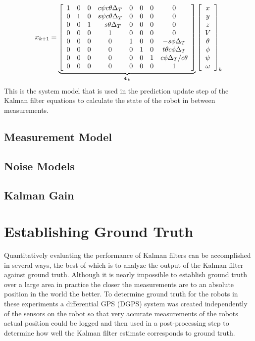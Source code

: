 \begin{align}
\label{eq:kfSystemModelWithAssumptions}
x_{k+1} = 
\underbrace{\left[\begin{array}{c c c c c c c c}
1 & 0 & 0 & c\psi c\theta \Delta_T & 0 & 0 & 0 & 0 \\
0 & 1 & 0 & s\psi c\theta \Delta_T & 0 & 0 & 0 & 0\\
0 & 0 & 1 & -s\theta \Delta_T & 0 & 0 & 0 & 0\\
0 & 0 & 0 & 1 & 0 & 0 & 0 & 0 \\
0 & 0 & 0 & 0 & 1 & 0 & 0 & -s\phi \Delta_T \\
0 & 0 & 0 & 0 & 0 & 1 & 0 & t\theta c\phi \Delta_T \\
0 & 0 & 0 & 0 & 0 & 0 & 1 & c\phi \Delta_T/c\theta \\
0 & 0 & 0 & 0 & 0 & 0 & 0 & 1
\end{array}\right]}_{\Phi_k}
\left[\begin{array}{c}
x \\ y \\ z \\ V \\ \theta \\ \phi \\ \psi \\ \omega
\end{array}\right]_k
\end{align}
This is the system model that is used in the prediction update step of the Kalman filter equations to calculate the state of the robot in between measurements.

\subsection{Measurement Model}
\label{sec:kfMeasurementModel}

\subsection{Noise Models}
\label{sec:kfNoiseModels}

\subsection{Kalman Gain}
\label{kfKalmanGain}

\section{Establishing Ground Truth}
\label{sec:groundtruth}
Quantitatively evaluating the performance of Kalman filters can be accomplished in several ways, the best of which is to analyze the output of the Kalman filter against ground truth. Although it is nearly impossible to establish ground truth over a large area in practice the closer the measurements are to an absolute position in the world the better. To determine ground truth for the robots in these experiments a differential GPS (DGPS) system was created independently of the sensors on the robot so that very accurate measurements of the robots actual position could be logged and then used in a post-processing step to determine how well the Kalman filter estimate corresponds to ground truth.

